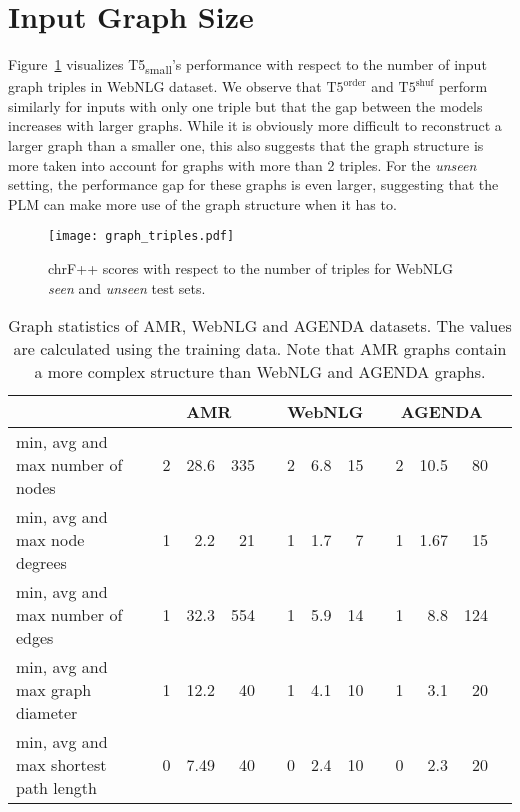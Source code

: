 \documentclass[11pt]{article}
\newcommand{\shufmodel}[3]{\ensuremath{\text{#1}^{\text{#3}}}}
\begin{document}
\section{Input Graph Size}
\label{section:inputgraphsize}
Figure~\ref{fig:graphs-triples} visualizes T5\textsubscript{small}'s performance with respect to the number of input graph triples in WebNLG dataset.
We observe that \shufmodel{T5}{small}{order} and \shufmodel{T5}{small}{shuf} perform similarly for inputs with only one triple but that the gap between the models increases with larger graphs. While it is obviously more difficult to reconstruct a larger graph than a smaller one, this also suggests that the graph structure is more taken into account for graphs with more than 2 triples.
For the \textit{unseen} setting, the performance gap for these graphs is even larger, suggesting that the PLM can make more use of the graph structure when it has to.

 \begin{figure}[h]
    \centering
    \texttt{[image: graph\_triples.pdf]}
    \caption{chrF++ scores with respect to the number of triples for WebNLG \textit{seen} and \textit{unseen} test sets.}
    \label{fig:graphs-triples}
\end{figure}
\vspace{-6mm}


\begin{table*}[t]
\centering
{\renewcommand{\arraystretch}{0.8}
\begin{tabular}{lp{0.2cm}rrrp{0.2cm}rrrp{0.2cm}rrrp{0.2cm}}  
\toprule
& & \multicolumn{3}{c}{\textbf{AMR}} & & \multicolumn{3}{c}{\textbf{WebNLG}} & & \multicolumn{3}{c}{\textbf{AGENDA}} \\
\midrule
min, avg and max number of nodes & & 2 & 28.6 & 335 &  & 2 & 6.8 & 15 & & 2 & 10.5 & 80 \\
min, avg and max node degrees & & 1 & 2.2 & 21 & & 1 & 1.7 & 7 & & 1 & 1.67 & 15 \\
min, avg and max number of edges & & 1 & 32.3 & 554 & & 1 & 5.9 & 14 & & 1 & 8.8 & 124 \\
min, avg and max graph diameter & & 1 & 12.2 & 40 & & 1 & 4.1 & 10 & & 1 & 3.1 & 20\\
min, avg and max shortest path length & & 0 & 7.49 & 40 & & 0 & 2.4 & 10 & & 0 & 2.3 & 20\\
\bottomrule
\end{tabular}}
\caption{Graph statistics of AMR, WebNLG and AGENDA datasets. The values are calculated using the training data. Note that AMR graphs contain a more complex structure than WebNLG and AGENDA graphs.}
\label{tab:graphstats}
\end{table*}
\end{document}
